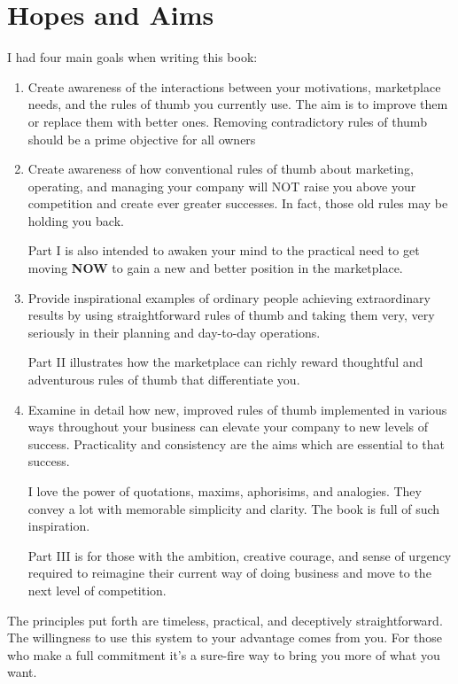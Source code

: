 \documentclass[
]{book}
\begin{document}
\hypertarget{hopes-and-aims}{%
\section{Hopes and Aims}\label{hopes-and-aims}}

I had four main goals when writing this book:

\begin{enumerate}
\def\labelenumi{\arabic{enumi}.}
\item
  Create awareness of the interactions between your motivations, marketplace needs, and the rules of thumb you currently use. The aim is to improve them or replace them with better ones. Removing contradictory rules of thumb should be a prime objective for all owners
\item
  Create awareness of how conventional rules of thumb about marketing, operating, and managing your company will {NOT} raise you above your competition and create ever greater successes. In fact, those old rules may be holding you back.

  Part I is also intended to awaken your mind to the practical need to get moving \textbf{NOW} to gain a new and better position in the marketplace.
\item
  Provide inspirational examples of ordinary people achieving extraordinary results by using straightforward rules of thumb and taking them very, very seriously in their planning and day-to-day operations.

  Part II illustrates how the marketplace can richly reward thoughtful and adventurous rules of thumb that differentiate you.
\item
  Examine in detail how new, improved rules of thumb implemented in various ways throughout your business can elevate your company to new levels of success. Practicality and consistency are the aims which are essential to that success.

  I love the power of quotations, maxims, aphorisims, and analogies. They convey a lot with memorable simplicity and clarity. The book is full of such inspiration.

  Part III is for those with the ambition, creative courage, and sense of urgency required to reimagine their current way of doing business and move to the next level of competition.
\end{enumerate}

The principles put forth are timeless, practical, and deceptively straightforward. The willingness to use this system to your advantage comes from you. For those who make a full commitment it's a sure-fire way to bring you more of what you want.
\end{document}
